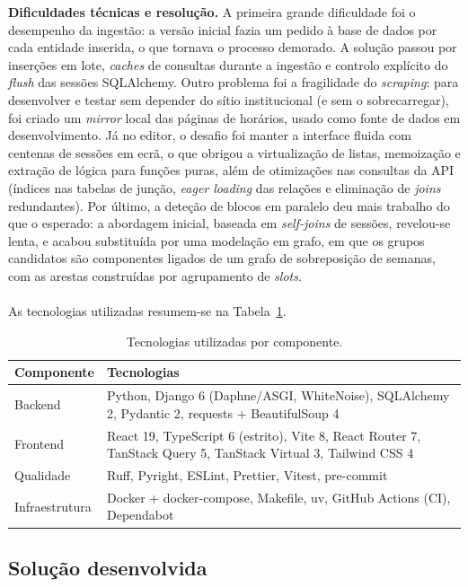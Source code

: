\documentclass[10pt]{article}
\begin{document}
    \textbf{Dificuldades técnicas e resolução.}  A primeira grande dificuldade foi o desempenho da ingestão: a versão inicial fazia um pedido à base de dados por cada entidade inserida, o que tornava o processo demorado. A solução passou por inserções em lote, \emph{caches} de consultas durante a ingestão e controlo explícito do \emph{flush} das sessões SQLAlchemy.
    Outro problema foi a fragilidade do \emph{scraping}: para desenvolver e testar sem depender do sítio institucional (e sem o sobrecarregar), foi criado um \emph{mirror} local das páginas de horários, usado como fonte de dados em desenvolvimento.
    Já no editor, o desafio foi manter a interface fluida com centenas de sessões em ecrã, o que obrigou a virtualização de listas, memoização e extração de lógica para funções puras, além de otimizações nas consultas da API (índices nas tabelas de junção, \emph{eager loading} das relações e eliminação de \emph{joins} redundantes).
    Por último, a deteção de blocos em paralelo deu mais trabalho do que o esperado: a abordagem inicial, baseada em \emph{self-joins} de sessões, revelou-se lenta, e acabou substituída por uma modelação em grafo, em que os grupos candidatos são componentes ligados de um grafo de sobreposição de semanas, com as arestas construídas por agrupamento de \emph{slots}.
    \\\\
    As tecnologias utilizadas resumem-se na Tabela~\ref{tab:tecnologias}.
 
\begin{table}[h]
\centering
\footnotesize
\begin{tabular}{@{}p{2.6cm} p{10.8cm}@{}}
\hline
\textbf{Componente} & \textbf{Tecnologias} \\
\hline
Backend & Python, Django 6 (Daphne/ASGI, WhiteNoise), SQLAlchemy 2, Pydantic 2, requests + BeautifulSoup 4 \\
Frontend & React 19, TypeScript 6 (estrito), Vite 8, React Router 7, TanStack Query 5, TanStack Virtual 3, Tailwind CSS 4 \\
Qualidade & Ruff, Pyright, ESLint, Prettier, Vitest, pre-commit \\
Infraestrutura & Docker + docker-compose, Makefile, uv, GitHub Actions (CI), Dependabot \\
\hline
\end{tabular}
\caption{Tecnologias utilizadas por componente.}
\label{tab:tecnologias}
\end{table}
 

\subsection{Solução desenvolvida}
\end{document}
